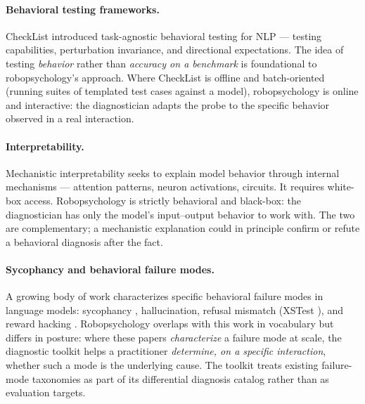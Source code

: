 \paragraph{Behavioral testing frameworks.}
CheckList \citep{ribeiro2020beyond} introduced task-agnostic behavioral
testing for NLP --- testing capabilities, perturbation invariance, and
directional expectations. The idea of testing \emph{behavior} rather
than \emph{accuracy on a benchmark} is foundational to robopsychology's
approach. Where CheckList is offline and batch-oriented (running suites
of templated test cases against a model), robopsychology is online and
interactive: the diagnostician adapts the probe to the specific
behavior observed in a real interaction.

\paragraph{Interpretability.}
Mechanistic interpretability \citep{olah2020zoom, elhage2021mathematical}
seeks to explain model behavior through internal mechanisms ---
attention patterns, neuron activations, circuits. It requires
white-box access. Robopsychology is strictly behavioral and black-box:
the diagnostician has only the model's input--output behavior to work
with. The two are complementary; a mechanistic explanation could in
principle confirm or refute a behavioral diagnosis after the fact.

\paragraph{Sycophancy and behavioral failure modes.}
A growing body of work characterizes specific behavioral failure modes
in language models: sycophancy \citep{sharma2023sycophancy,
perez2022discovering}, hallucination, refusal mismatch (XSTest
\citep{rottger2023xstest}), and reward hacking
\citep{lambert2024rewardbench}. Robopsychology overlaps with this work
in vocabulary but differs in posture: where these papers
\emph{characterize} a failure mode at scale, the diagnostic toolkit
helps a practitioner \emph{determine, on a specific interaction},
whether such a mode is the underlying cause. The toolkit treats
existing failure-mode taxonomies as part of its differential diagnosis
catalog rather than as evaluation targets.

